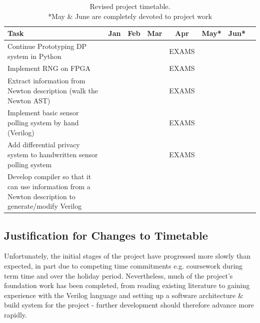 \documentclass[pageno]{jpaper}
\begin{document}
\begin{table}[t]
  \begin{center}
    \begin{tabular}{|p{7cm}||c|c|c|c|c|c|c|}
      \hline
      \textbf{Task} & \textbf{Jan} & \textbf{Feb} & \textbf{Mar} & \textbf{Apr} & \textbf{May*} & \textbf{Jun*}\\
      \hline \hline
      Continue Prototyping DP system in Python & \cellcolor[gray]{0.8} & \cellcolor[gray]{0.8} & \cellcolor[gray]{0.8} & EXAMS &  & \\
      \hline
      Implement RNG on FPGA & \cellcolor[gray]{0.8} & \cellcolor[gray]{0.8} & \cellcolor[gray]{0.8} & EXAMS &  &  \\
      \hline
      Extract information from Newton description (walk the Newton AST) & \cellcolor[gray]{0.8} & \cellcolor[gray]{0.8} & \cellcolor[gray]{0.8} & \cellcolor[gray]{0.8} EXAMS & \cellcolor[gray]{0.8} &  \\
      \hline
      Implement basic sensor polling system by hand (Verilog) & \cellcolor[gray]{0.8} & \cellcolor[gray]{0.8} & \cellcolor[gray]{0.8} & \cellcolor[gray]{0.8}EXAMS & \cellcolor[gray]{0.8} &  \\
      \hline
      Add differential privacy system to handwritten sensor polling system &  &  &  & \cellcolor[gray]{0.8}EXAMS & \cellcolor[gray]{0.8} &  \\
      \hline
      Develop compiler so that it can use information from a Newton description to generate/modify Verilog &  &  &  &  &  & \cellcolor[gray]{0.8} \\
      \hline
    \end{tabular}
    \caption{Revised project timetable. \\ \**May \& June are completely devoted to project work}
    \label{table:timetable}
  \end{center}
\end{table}
\subsection{Justification for Changes to Timetable}
Unfortunately, the initial stages of the project have progressed more slowly than expected, in part due to competing time commitments e.g. coursework during term time and over the holiday period. Nevertheless, much of the project's foundation work has been completed, from reading existing literature to gaining experience with the Verilog language and setting up a software architecture \& build system for the project - further development should therefore advance more rapidly.
\end{document}
